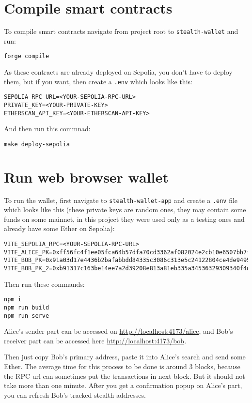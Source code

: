 \section{Compile smart contracts}

To compile smart contracts navigate from project root to \texttt{stealth-wallet} and run:
\begin{verbatim}
forge compile
\end{verbatim}

As these contracts are already deployed on Sepolia, you don't have to deploy them,
but if you want, then create a \texttt{.env} which looks like this:

\begin{verbatim}
SEPOLIA_RPC_URL=<YOUR-SEPOLIA-RPC-URL>
PRIVATE_KEY=<YOUR-PRIVATE-KEY>
ETHERSCAN_API_KEY=<YOUR-ETHERSCAN-API-KEY>
\end{verbatim}

And then run this commnad:

\begin{verbatim}
make deploy-sepolia
\end{verbatim}

\section{Run web browser wallet}\label{section:web}

To run the wallet, first navigate to \texttt{stealth-wallet-app} and create a
\texttt{.env} file which looks like this (these private keys are random ones,
they may contain some funds on some mainnet, in this project they were
used only as a testing ones and already have some Ether on Sepolia):

\begin{small}
\begin{verbatim}
VITE_SEPOLIA_RPC=<YOUR-SEPOLIA-RPC-URL>
VITE_ALICE_PK=0xff56fc4f1ee05fca64b57dfa70cd3362af082024e2cb10e6507bb7fa0781887d
VITE_BOB_PK=0x91a03d17e4436b2bafabbdd84335c3086c313e5c24122804ce4de94957502981
VITE_BOB_PK_2=0xb91317c163be14ee7a2d39208e813a81eb335a34536329309340f4da821840dc
\end{verbatim}
\end{small}

Then run these commands:
\begin{verbatim}
npm i
npm run build
npm run serve
\end{verbatim}

Alice's sender part can be accessed on \url{http://localhost:4173/alice}, and
Bob's receiver part can be accessed here \url{http://localhost:4173/bob}.

Then just copy Bob's primary address, paste it into Alice's search and send some
Ether. The average time for this process to be done is around 3 blocks, because
the RPC url can sometimes put the transactions in next block. But it should not
take more than one minute. After you get a confirmation popup on Alice's part,
you can refresh Bob's tracked stealth addresses.
